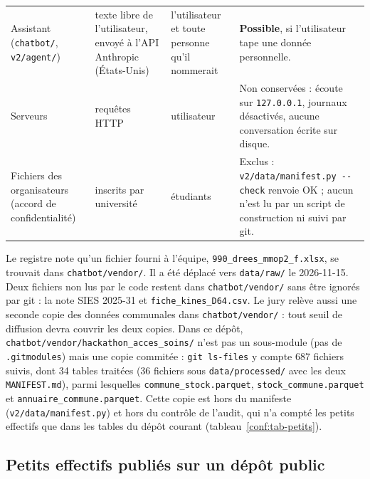\begin{small}
\begin{longtable}{@{}p{}p{}p{}p{}@{}}
Assistant (\texttt{chatbot/\allowbreak{}}, \texttt{v2/\allowbreak{}agent/\allowbreak{}}) & texte libre de l'utilisateur, envoyé à l'API Anthropic (États-Unis) & l'utilisateur et toute personne qu'il nommerait & \textbf{Possible}, si l'utilisateur tape une donnée personnelle. \\
Serveurs & requêtes HTTP & utilisateur & Non conservées : écoute sur \texttt{127.0.0.1}, journaux désactivés, aucune conversation écrite sur disque. \\
Fichiers des organisateurs (accord de confidentialité) & inscrits par université & étudiants & Exclus : \texttt{v2/\allowbreak{}data/\allowbreak{}manifest.py -\allowbreak{}-\allowbreak{}check} renvoie OK ; aucun n'est lu par un script de construction ni suivi par git. \\
\end{longtable}
\end{small}

Le registre note qu'un fichier fourni à l'équipe, \texttt{990\_\allowbreak{}drees\_\allowbreak{}mmop2\_\allowbreak{}f.xlsx}, se trouvait dans \texttt{chatbot/\allowbreak{}vendor/\allowbreak{}}. Il a été déplacé vers \texttt{data/\allowbreak{}raw/\allowbreak{}} le 2026-11-15.
Deux fichiers non lus par le code restent dans \texttt{chatbot/\allowbreak{}vendor/\allowbreak{}} sans être ignorés par git : la note SIES 2025-31 et \texttt{fiche\_\allowbreak{}kines\_\allowbreak{}D64.csv}.
Le jury relève aussi une seconde copie des données communales dans \texttt{chatbot/\allowbreak{}vendor/\allowbreak{}} : tout seuil de diffusion devra couvrir les deux copies.
Dans ce dépôt, \texttt{chatbot/\allowbreak{}vendor/\allowbreak{}hackathon\_\allowbreak{}acces\_\allowbreak{}soins/\allowbreak{}} n'est pas un sous-module (pas de \texttt{.gitmodules}) mais une copie commitée : \texttt{git ls-files} y compte 687\mesure{} fichiers suivis, dont 34\mesure{} tables traitées (36\mesure{} fichiers sous \texttt{data/\allowbreak{}processed/\allowbreak{}} avec les deux \texttt{MANIFEST.md}), parmi lesquelles \texttt{commune\_\allowbreak{}stock.parquet}, \texttt{stock\_\allowbreak{}commune.parquet} et \texttt{annuaire\_\allowbreak{}commune.parquet}.
Cette copie est hors du manifeste (\texttt{v2/\allowbreak{}data/\allowbreak{}manifest.py}) et hors du contrôle de l'audit, qui n'a compté les petits effectifs que dans les tables du dépôt courant (tableau~\ref{conf:tab-petits}).

\subsection{Petits effectifs publiés sur un dépôt public}\label{conf:petits}

